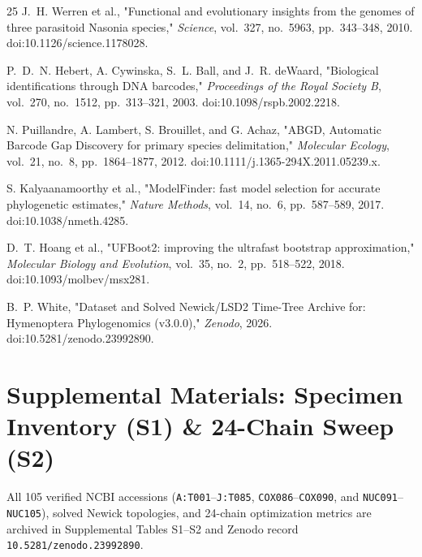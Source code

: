 \documentclass[10pt,letterpaper]{article}
\begin{document}
\begin{thebibliography}{25}
J.~H. Werren et al., "Functional and evolutionary insights from the genomes of three parasitoid Nasonia species," \emph{Science}, vol.~327, no.~5963, pp.~343--348, 2010. doi:10.1126/science.1178028.

P.~D.~N. Hebert, A. Cywinska, S.~L. Ball, and J.~R. deWaard, "Biological identifications through DNA barcodes," \emph{Proceedings of the Royal Society B}, vol.~270, no.~1512, pp.~313--321, 2003. doi:10.1098/rspb.2002.2218.

N. Puillandre, A. Lambert, S. Brouillet, and G. Achaz, "ABGD, Automatic Barcode Gap Discovery for primary species delimitation," \emph{Molecular Ecology}, vol.~21, no.~8, pp.~1864--1877, 2012. doi:10.1111/j.1365-294X.2011.05239.x.

S. Kalyaanamoorthy et al., "ModelFinder: fast model selection for accurate phylogenetic estimates," \emph{Nature Methods}, vol.~14, no.~6, pp.~587--589, 2017. doi:10.1038/nmeth.4285.

D.~T. Hoang et al., "UFBoot2: improving the ultrafast bootstrap approximation," \emph{Molecular Biology and Evolution}, vol.~35, no.~2, pp.~518--522, 2018. doi:10.1093/molbev/msx281.

B.~P. White, "Dataset and Solved Newick/LSD2 Time-Tree Archive for: Hymenoptera Phylogenomics (v3.0.0)," \emph{Zenodo}, 2026. doi:10.5281/zenodo.23992890.

\end{thebibliography}

\section{Supplemental Materials: Specimen Inventory (S1) \& 24-Chain Sweep (S2)}
All 105 verified NCBI accessions (\texttt{A:T001}--\texttt{J:T085}, \texttt{COX086}--\texttt{COX090}, and \texttt{NUC091}--\texttt{NUC105}), solved Newick topologies, and 24-chain optimization metrics are archived in Supplemental Tables S1--S2 and Zenodo record \texttt{10.5281/zenodo.23992890}.
\end{document}
